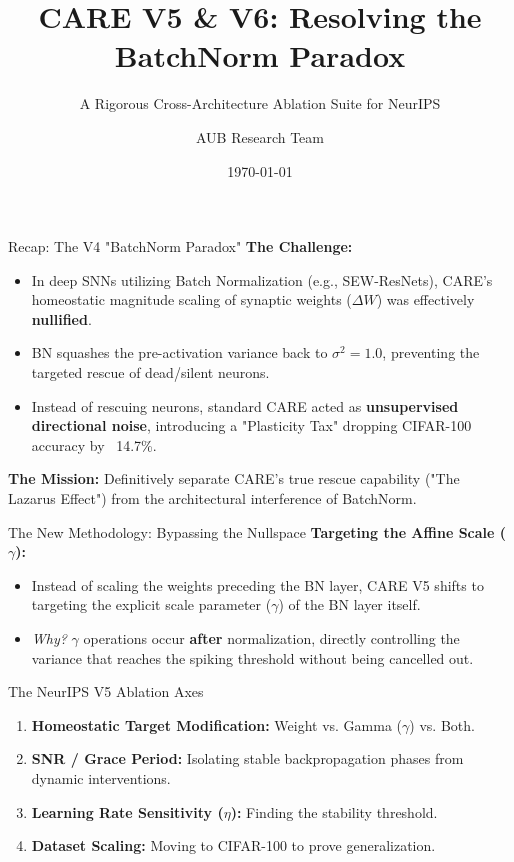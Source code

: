 \documentclass[aspectratio=169]{beamer}
\title{CARE V5 \& V6: Resolving the BatchNorm Paradox}
\subtitle{A Rigorous Cross-Architecture Ablation Suite for NeurIPS}
\author{AUB Research Team}
\date{\today}
\begin{document}
\begin{frame}
    \titlepage
\end{frame}

\begin{frame}{Recap: The V4 "BatchNorm Paradox"}
    \textbf{The Challenge:}
    \begin{itemize}
        \item In deep SNNs utilizing Batch Normalization (e.g., SEW-ResNets), CARE's homeostatic magnitude scaling of synaptic weights ($\Delta W$) was effectively \textbf{nullified}.
        \item BN squashes the pre-activation variance back to $\sigma^2 = 1.0$, preventing the targeted rescue of dead/silent neurons.
        \item Instead of rescuing neurons, standard CARE acted as \textbf{unsupervised directional noise}, introducing a "Plasticity Tax" dropping CIFAR-100 accuracy by ~14.7\%.
    \end{itemize}
    
    \vspace{0.3cm}
    \textbf{The Mission:} Definitively separate CARE's true rescue capability ("The Lazarus Effect") from the architectural interference of BatchNorm.
\end{frame}

\begin{frame}{The New Methodology: Bypassing the Nullspace}
    \textbf{Targeting the Affine Scale ($\gamma$):}
    \begin{itemize}
        \item Instead of scaling the weights preceding the BN layer, CARE V5 shifts to targeting the explicit scale parameter ($\gamma$) of the BN layer itself.
        \item \textit{Why?} $\gamma$ operations occur \textbf{after} normalization, directly controlling the variance that reaches the spiking threshold without being cancelled out. 
    \end{itemize}

    \vspace{0.3cm}
    \begin{block}{The NeurIPS V5 Ablation Axes}
        \begin{enumerate}
            \item \textbf{Homeostatic Target Modification:} Weight vs. Gamma ($\gamma$) vs. Both.
            \item \textbf{SNR / Grace Period:} Isolating stable backpropagation phases from dynamic interventions.
            \item \textbf{Learning Rate Sensitivity ($\eta$):} Finding the stability threshold.
            \item \textbf{Dataset Scaling:} Moving to CIFAR-100 to prove generalization.
        \end{enumerate}
    \end{block}
\end{frame}
\end{document}
